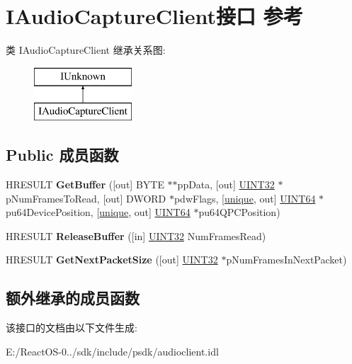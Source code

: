 \hypertarget{interface_i_audio_capture_client}{}\section{I\+Audio\+Capture\+Client接口 参考}
\label{interface_i_audio_capture_client}
类 I\+Audio\+Capture\+Client 继承关系图\+:\begin{figure}[H]
\begin{center}
\leavevmode
\includegraphics[height=2.000000cm]{interface_i_audio_capture_client}
\end{center}
\end{figure}
\subsection*{Public 成员函数}
\begin{DoxyCompactItemize}
\item 
\mbox{\label{interface_i_audio_capture_client_a700d5b2d30683332983ba757ad7edc35}} 
H\+R\+E\+S\+U\+LT {\bfseries Get\+Buffer} (\mbox{[}out\mbox{]} B\+Y\+TE $\ast$$\ast$pp\+Data, \mbox{[}out\mbox{]} \hyperlink{_processor_bind_8h_ae1e6edbbc26d6fbc71a90190d0266018}{U\+I\+N\+T32} $\ast$p\+Num\+Frames\+To\+Read, \mbox{[}out\mbox{]} D\+W\+O\+RD $\ast$pdw\+Flags, \mbox{[}\hyperlink{interfaceunique}{unique}, out\mbox{]} \hyperlink{_processor_bind_8h_a57be03562867144161c1bfee95ca8f7c}{U\+I\+N\+T64} $\ast$pu64\+Device\+Position, \mbox{[}\hyperlink{interfaceunique}{unique}, out\mbox{]} \hyperlink{_processor_bind_8h_a57be03562867144161c1bfee95ca8f7c}{U\+I\+N\+T64} $\ast$pu64\+Q\+P\+C\+Position)
\item 
\mbox{\label{interface_i_audio_capture_client_ae94f85331631ba311dd7b4186c86f7bf}} 
H\+R\+E\+S\+U\+LT {\bfseries Release\+Buffer} (\mbox{[}in\mbox{]} \hyperlink{_processor_bind_8h_ae1e6edbbc26d6fbc71a90190d0266018}{U\+I\+N\+T32} Num\+Frames\+Read)
\item 
\mbox{\label{interface_i_audio_capture_client_aa391ff5b2919c6c53640f9a136bbc2c0}} 
H\+R\+E\+S\+U\+LT {\bfseries Get\+Next\+Packet\+Size} (\mbox{[}out\mbox{]} \hyperlink{_processor_bind_8h_ae1e6edbbc26d6fbc71a90190d0266018}{U\+I\+N\+T32} $\ast$p\+Num\+Frames\+In\+Next\+Packet)
\end{DoxyCompactItemize}
\subsection*{额外继承的成员函数}


该接口的文档由以下文件生成\+:\begin{DoxyCompactItemize}
\item 
E\+:/\+React\+O\+S-\/0../sdk/include/psdk/audioclient.\+idl\end{DoxyCompactItemize}
